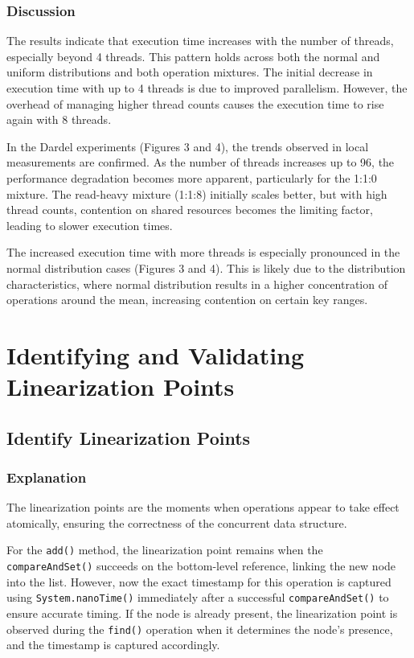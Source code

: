 \documentclass{article}
\begin{document}
\subsubsection{Discussion}
The results indicate that execution time increases with the number of threads, especially beyond 4 threads. This pattern holds across both the normal and uniform distributions and both operation mixtures. The initial decrease in execution time with up to 4 threads is due to improved parallelism. However, the overhead of managing higher thread counts causes the execution time to rise again with 8 threads.

In the Dardel experiments (Figures 3 and 4), the trends observed in local measurements are confirmed. As the number of threads increases up to 96, the performance degradation becomes more apparent, particularly for the 1:1:0 mixture. The read-heavy mixture (1:1:8) initially scales better, but with high thread counts, contention on shared resources becomes the limiting factor, leading to slower execution times.

The increased execution time with more threads is especially pronounced in the normal distribution cases (Figures 3 and 4). This is likely due to the distribution characteristics, where normal distribution results in a higher concentration of operations around the mean, increasing contention on certain key ranges.


\newpage
\section{Identifying and Validating Linearization Points}

\subsection{Identify Linearization Points}

\subsubsection{Explanation}
The linearization points are the moments when operations appear to take effect atomically, ensuring the correctness of the concurrent data structure.

For the \texttt{add()} method, the linearization point remains when the \texttt{compareAndSet()} succeeds on the bottom-level reference, linking the new node into the list. However, now the exact timestamp for this operation is captured using \texttt{System.nanoTime()} immediately after a successful \texttt{compareAndSet()} to ensure accurate timing. If the node is already present, the linearization point is observed during the \texttt{find()} operation when it determines the node’s presence, and the timestamp is captured accordingly.
\end{document}
